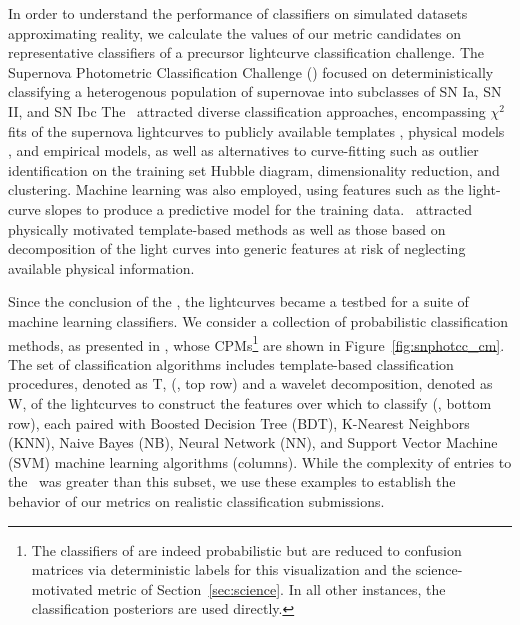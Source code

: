 
In order to understand the performance of classifiers on simulated datasets approximating reality, we calculate the values of our metric candidates on representative classifiers of a precursor lightcurve classification challenge.
The Supernova Photometric Classification Challenge (\snphotcc) \citep{kessler_supernova_2010} focused on deterministically classifying a heterogenous population of supernovae into subclasses of SN Ia, SN II, and SN Ibc
The \snphotcc\ attracted diverse classification approaches, encompassing $\chi^{2}$ fits of the supernova lightcurves to publicly available templates \citep{nugent_kcorrections_2002}, physical models \citep{conley_sifto:_2008}, and empirical models, as well as alternatives to curve-fitting such as outlier identification on the training set Hubble diagram, dimensionality reduction, and clustering.
Machine learning was also employed, using features such as the light-curve slopes to produce a predictive model for the training data.
\snphotcc\ attracted physically motivated template-based methods as well as those based on decomposition of the light curves into generic features at risk of neglecting available physical information.

Since the conclusion of the \snphotcc, the lightcurves became a testbed for a suite of machine learning classifiers.
We consider a collection of probabilistic classification methods, as presented in \citet{lochner_photometric_2016}, whose CPMs\footnote{The classifiers of \citet{lochner_photometric_2016} are indeed probabilistic but are reduced to confusion matrices via deterministic labels for this visualization and the science-motivated metric of Section~\ref{sec:science}.
In all other instances, the classification posteriors are used directly.} are shown in Figure~\ref{fig:snphotcc_cm}.
The set of classification algorithms includes template-based classification procedures, denoted as T, (\citet{sako_photometric_2011}, top row) and a wavelet decomposition, denoted as W, of the lightcurves to construct the features over which to classify (\citet{newling_statistical_2011}, bottom row), each paired with Boosted Decision Tree (BDT), K-Nearest Neighbors (KNN), Naive Bayes (NB), Neural Network (NN), and Support Vector Machine (SVM) machine learning algorithms (columns).
While the complexity of entries to the \snphotcc\ was greater than this subset, we use these examples to establish the behavior of our metrics on realistic classification submissions.

